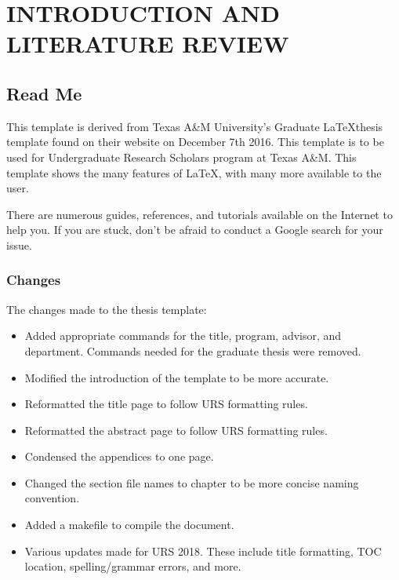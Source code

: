 %
%
%
%


\pagestyle{plain} %

\chapter{INTRODUCTION AND LITERATURE REVIEW}

\section{Read Me}

This template is derived from Texas A\&M University's Graduate \LaTeX thesis template found on their website on December 7th 2016. This template is to be used for Undergraduate
Research Scholars program at Texas A\&M. This template shows the many features of \LaTeX, with many more available to the user.

There are numerous guides, references, and tutorials available on the Internet to help you. If you are stuck, don't be afraid to conduct a Google search for your issue.

\subsection{Changes}

The changes made to the thesis template:
\begin{itemize}
  \item Added appropriate commands for the title, program, advisor, and department. Commands needed for the graduate thesis were removed.
  \item Modified the introduction of the template to be more accurate.
  \item Reformatted the title page to follow URS formatting rules.
  \item Reformatted the abstract page to follow URS formatting rules.
  \item Condensed the appendices to one page.
  \item Changed the section file names to chapter to be more concise naming convention.
  \item Added a makefile to compile the document.
  \item Various updates made for URS 2018. These include title formatting, TOC
    location, spelling/grammar errors, and more.
\end{itemize}

